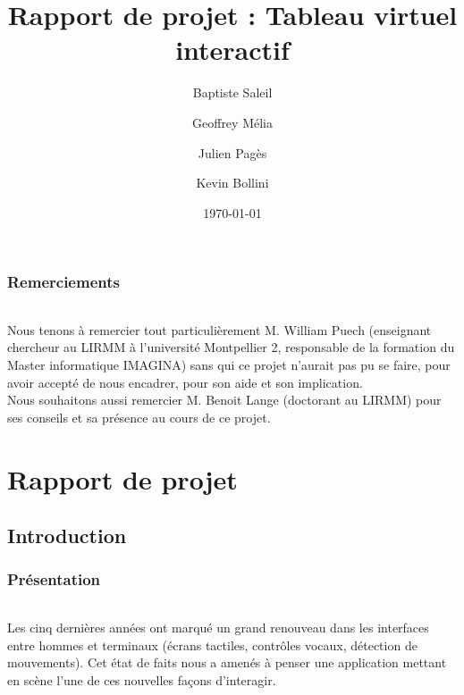 \documentclass{report}
\title{Rapport de projet : Tableau virtuel interactif}
\author{Baptiste Saleil \and Geoffrey Mélia \and Julien Pagès \and Kevin Bollini}
\date{\today}
\begin{document}
	\maketitle
	\thispagestyle{empty}
	\newpage
	
	\tableofcontents

	\listoffigures
	
	\newpage
	\section*{Remerciements}
	\paragraph{}
	Nous tenons à remercier tout particulièrement M. William Puech (enseignant chercheur au LIRMM à l'université Montpellier 2, responsable de la formation du Master informatique IMAGINA) sans qui ce projet n'aurait pas pu se faire, pour avoir accepté de nous encadrer, pour son aide et son implication.\\
	Nous souhaitons aussi remercier M. Benoit Lange (doctorant au LIRMM) pour ses conseils et sa présence au cours de ce projet. \\
	\part{Rapport de projet}
	\newpage
	\chapter{Introduction}
		\section{Présentation}
		\paragraph{}
		Les cinq dernières années ont marqué un grand renouveau dans les interfaces entre hommes et terminaux (écrans tactiles, contrôles vocaux, détection de mouvements). Cet état de faits nous a amenés à penser une application mettant en scène l'une de ces nouvelles façons d'interagir.
\end{document}
